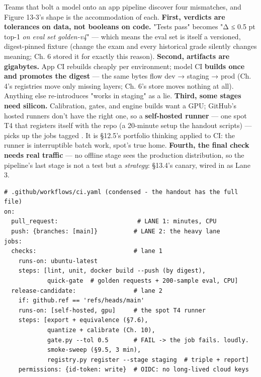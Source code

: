 Teams that bolt a model onto an app pipeline discover four mismatches, and Figure 13-3's shape is the accommodation of each. \textbf{First, verdicts are tolerances on data, not booleans on code.} "Tests pass" becomes "Δ ≤ 0.5 pt top-1 \textit{on eval set golden-v4}" — which means the eval set is itself a versioned, digest-pinned fixture (change the exam and every historical grade silently changes meaning; Ch. 6 stored it for exactly this reason). \textbf{Second, artifacts are gigabytes.} App CI rebuilds cheaply per environment; model CI \textbf{builds once and promotes the digest} — the same bytes flow dev → staging → prod (Ch. 4's registries move only missing layers; Ch. 6's store moves nothing at all). Anything else re-introduces "works in staging" as a lie. \textbf{Third, some stages need silicon.} Calibration, gates, and engine builds want a GPU; GitHub's hosted runners don't have the right one, so a \textbf{self-hosted runner} — one spot T4 that registers itself with the repo (a 20-minute setup the handout scripts) — picks up the jobs tagged . It is §12.5's portfolio thinking applied to CI: the runner is interruptible batch work, spot's true home. \textbf{Fourth, the final check needs real traffic} — no offline stage sees the production distribution, so the pipeline's last stage is not a test but a \textit{strategy}: §13.4's canary, wired in as Lane 3.

\begin{terminalbox}
\begin{Verbatim}[breaklines=true,breakanywhere=true,fontsize=\small,formatcom=\color{tbbtermfg},codes=\tbbcodeactive]
# .github/workflows/ci.yaml (condensed - the handout has the full file)
on:
  pull_request:                      # LANE 1: minutes, CPU
  push: {branches: [main]}          # LANE 2: the heavy lane
jobs:
  checks:                           # lane 1
    runs-on: ubuntu-latest
    steps: [lint, unit, docker build --push (by digest),
            quick-gate  # golden requests + 200-sample eval, CPU]
  release-candidate:                # lane 2
    if: github.ref == 'refs/heads/main'
    runs-on: [self-hosted, gpu]     # the spot T4 runner
    steps: [export + equivalence (§7.6),
            quantize + calibrate (Ch. 10),
            gate.py --tol 0.5       # FAIL -> the job fails. loudly.
            smoke-sweep (§9.5, 3 min),
            registry.py register --stage staging  # triple + report]
    permissions: {id-token: write}  # OIDC: no long-lived cloud keys
\end{Verbatim}
\end{terminalbox}

